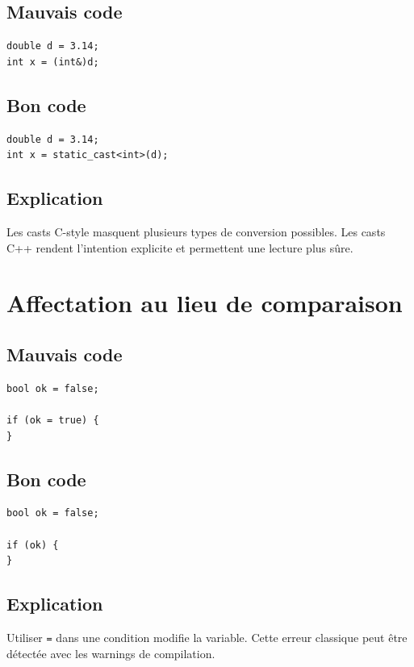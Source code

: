 \documentclass[a4paper,11pt]{report}
\begin{document}
\section{Mauvais code}
\begin{lstlisting}
double d = 3.14;
int x = (int&)d;
\end{lstlisting}

\section{Bon code}
\begin{lstlisting}
double d = 3.14;
int x = static_cast<int>(d);
\end{lstlisting}

\section{Explication}
Les casts C-style masquent plusieurs types de conversion possibles.
Les casts C++ rendent l'intention explicite et permettent une lecture plus sûre.

\chapter{Affectation au lieu de comparaison}

\section{Mauvais code}
\begin{lstlisting}
bool ok = false;

if (ok = true) {
}
\end{lstlisting}

\section{Bon code}
\begin{lstlisting}
bool ok = false;

if (ok) {
}
\end{lstlisting}

\section{Explication}
Utiliser \texttt{=} dans une condition modifie la variable.
Cette erreur classique peut être détectée avec les warnings de compilation.
\end{document}
